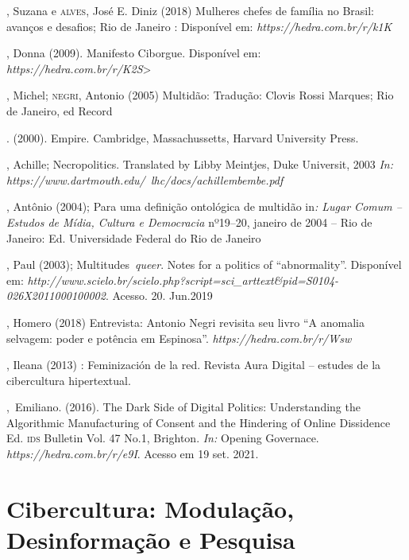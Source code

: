 \begin{bibliohedra}
, Suzana e \textsc{alves}, José E. Diniz (2018) Mulheres chefes de
família no Brasil: avanços e desafios; Rio de Janeiro : Disponível em:
\emph{https://hedra.com.br/r/k1K}

, Donna (2009). Manifesto Ciborgue. Disponível em:
\emph{https://hedra.com.br/r/K2S}\textgreater{} %

, Michel; \textsc{negri}, Antonio (2005) Multidão: Tradução: Clovis Rossi
Marques; Rio de Janeiro, ed Record

\titidem. (2000). Empire. Cambridge,
Massachussetts, Harvard University Press.

, Achille; Necropolitics. Translated by Libby Meintjes, Duke
Universit, 2003 \emph{In:}
\emph{https://www.dartmouth.edu/~lhc/docs/achillembembe.pdf} %

, Antônio (2004); Para uma definição ontológica de multidão
in\emph{: Lugar Comum -- Estudos de Mídia, Cultura e Democracia} nº19--20,
janeiro de 2004 -- Rio de Janeiro: Ed. Universidade Federal do Rio de
Janeiro

, Paul (2003); Multitudes~\emph{queer}. Notes for a politics of
``abnormality''. Disponível em:
\emph{http://www.scielo.br/scielo.php?script=sci\_arttext\&pid=S0104-026X2011000100002}. %
Acesso. 20. Jun.2019

, Homero (2018) Entrevista: Antonio Negri revisita seu livro ``A
anomalia selvagem: poder e potência em Espinosa''.
\emph{https://hedra.com.br/r/Wsw}

, Ileana (2013) : Feminización de la red. Revista Aura
Digital -- estudes de la cibercultura hipertextual.

,~Emiliano. (2016). The Dark Side of Digital Politics:
Understanding the Algorithmic Manufacturing of Consent and the Hindering
of Online Dissidence Ed. \textsc{ids} Bulletin Vol. 47 No.1, Brighton. \emph{In:}
Opening Governace. \emph{https://hedra.com.br/r/e9I}. Acesso em 19 set. 2021.
\end{bibliohedra}

\part{Cibercultura: Modulação, Desinformação e Pesquisa}


